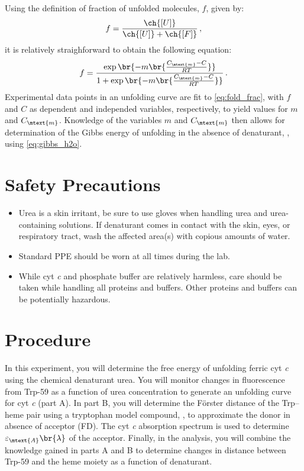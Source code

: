 Using the definition of fraction of unfolded molecules, \( f \), given by:
\begin{equation}
	f = \frac{\ch{[U]}}{\ch{[U]} + \ch{[F]}} \, ,
	\label{eq:conc_frac}
\end{equation}
it is relatively straighforward to obtain the following equation:
\begin{equation}
	f = \frac{ \exp\br{ -m \br{\frac{C_\mtext{m} - C}{RT}}}}{1 + \exp\br{-m \br{\frac{C_\mtext{m} - C}{RT}}}} \, .
	\label{eq:fold_frac}
\end{equation}
Experimental data points in an unfolding curve are fit to \cref{eq:fold_frac}, with \( f \) and \( C \) as dependent and independed variables, respectively, to yield values for \( m \) and \( C_\mtext{m} \). 
Knowledge of the variables \( m \) and \( C_\mtext{m} \) then allows for determination of the Gibbs energy of unfolding in the absence of denaturant, \gibbs*[subscript-right=\ch{H2O}], using \cref{eq:gibbs_h2o}.



\section{Safety Precautions} %
\label{sec:safety_precautions}

\begin{itemize}
	\item Urea is a skin irritant, be sure to use gloves when handling urea and urea-containing solutions. If denaturant comes in contact with the skin, eyes, or respiratory tract, wash the affected area(s) with copious amounts of water. 
	\item Standard PPE should be worn at all times during the lab. 
	\item While cyt \emph{c} and phosphate buffer are relatively harmless, care should be taken while handling all proteins and buffers. Other proteins and buffers can be potentially hazardous. 
\end{itemize}


\section{Procedure} %
\label{sec:procedure}

In this experiment, you will determine the free energy of unfolding ferric cyt \emph{c} using the chemical denaturant urea. 
You will monitor changes in fluorescence from Trp-59 as a function of urea concentration to generate an unfolding curve for cyt \emph{c} (part A).  
In part B, you will determine the Förster distance of the Trp--heme pair using a tryptophan model compound, , to approximate the donor in absence of acceptor (FD).  
The cyt \emph{c} absorption spectrum is used to determine \( \varepsilon_\mtext{A} \br{\lambda} \) of the acceptor. 
Finally, in the analysis, you will combine the knowledge gained in parts A and B to determine changes in distance between Trp-59 and the heme moiety as a function of denaturant. 

